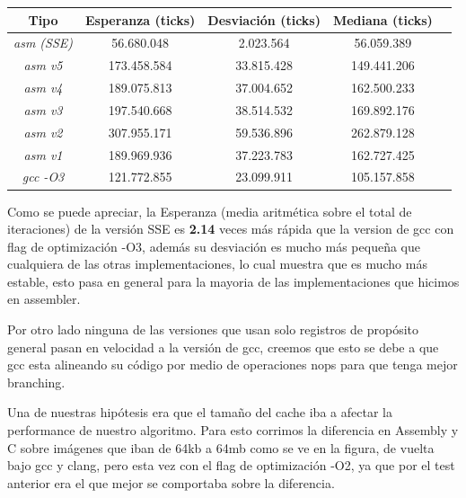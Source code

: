 \documentclass[a4paper]{article}
\begin{document}
\begin{center}
        \begin{tabular}[c]{|c|c|c|c|c|}
    \hline
        \textbf{Tipo} &  \textbf{Esperanza (ticks)} & \textbf{Desviación (ticks)} & \textbf{Mediana (ticks)}\\
        \hline
\textit{asm (SSE)} &    56.680.048  & 2.023.564 & 56.059.389\\
        \hline
\textit{asm v5} &   173.458.584    & 33.815.428 & 149.441.206\\
        \hline
\textit{asm v4} &   189.075.813    & 37.004.652 & 162.500.233 \\
        \hline
\textit{asm v3} &  197.540.668  & 38.514.532 & 169.892.176\\
        \hline
\textit{asm v2} &  307.955.171   & 59.536.896 & 262.879.128\\
        \hline
\textit{asm v1} &  189.969.936 & 37.223.783 & 162.727.425\\
        \hline
\textit{gcc -O3} &  121.772.855 & 23.099.911 & 105.157.858\\
        \hline
    \end{tabular}
\end{center}

Como se puede apreciar, la Esperanza (media aritmética sobre el total de iteraciones) de la versión SSE es \textbf{2.14} veces más rápida que la version de gcc con flag de optimización -O3, además su desviación es mucho más pequeña que cualquiera de las otras implementaciones, lo cual muestra que es mucho más estable, esto pasa en general para la mayoria de las implementaciones que hicimos en assembler.

Por otro lado ninguna de las versiones que usan solo registros de propósito general pasan en velocidad a la versión de gcc, creemos que esto se debe a que gcc esta alineando su código por medio de operaciones nops para que tenga mejor branching.



Una de nuestras hipótesis era que el tamaño del cache iba a afectar la performance de nuestro algoritmo. Para esto corrimos la diferencia en Assembly y C sobre imágenes que iban de 64kb a 64mb como se ve en la figura, de vuelta bajo gcc y clang, pero esta vez con el flag de optimización -O2, ya que por el test anterior era el que mejor se comportaba sobre la diferencia. 
\end{document}
